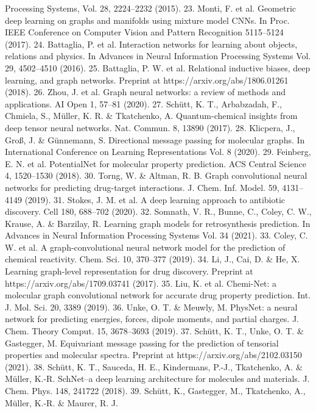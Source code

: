 Processing Systems, Vol. 28, 2224–2232 (2015).
	23.
Monti, F. et al. Geometric deep learning on graphs and manifolds using
mixture model CNNs. In Proc. IEEE Conference on Computer Vision and
Pattern Recognition 5115–5124 (2017).
	24.
Battaglia, P. et al. Interaction networks for learning about objects, relations
and physics. In Advances in Neural Information Processing Systems Vol. 29,
4502–4510 (2016).
	25.
Battaglia, P. W. et al. Relational inductive biases, deep learning, and graph
networks. Preprint at https://arxiv.org/abs/1806.01261 (2018).
	26.
Zhou, J. et al. Graph neural networks: a review of methods and
applications. AI Open 1, 57–81 (2020).
	27.
Schütt, K. T., Arbabzadah, F., Chmiela, S., Müller, K. R. \& Tkatchenko, A.
Quantum-chemical insights from deep tensor neural networks. Nat.
Commun. 8, 13890 (2017).
	28.
Klicpera, J., Groß, J. \& Günnemann, S. Directional message passing for
molecular graphs. In International Conference on Learning Representations
Vol. 8 (2020).
	29.
Feinberg, E. N. et al. PotentialNet for molecular property prediction. ACS
Central Science 4, 1520–1530 (2018).
	30.
Torng, W. \& Altman, R. B. Graph convolutional neural networks for
predicting drug-target interactions. J. Chem. Inf. Model. 59, 4131–4149
(2019).
	31.
Stokes, J. M. et al. A deep learning approach to antibiotic discovery. Cell
180, 688–702 (2020).
	32.
Somnath, V. R., Bunne, C., Coley, C. W., Krause, A. \& Barzilay, R. Learning
graph models for retrosynthesis prediction. In Advances in Neural
Information Processing Systems Vol. 34 (2021).
	33.
Coley, C. W. et al. A graph-convolutional neural network model for the
prediction of chemical reactivity. Chem. Sci. 10, 370–377 (2019).
	34.
Li, J., Cai, D. \& He, X. Learning graph-level representation for drug
discovery. Preprint at https://arxiv.org/abs/1709.03741 (2017).
	35.
Liu, K. et al. Chemi-Net: a molecular graph convolutional network for
accurate drug property prediction. Int. J. Mol. Sci. 20, 3389 (2019).
	36.
Unke, O. T. \& Meuwly, M. PhysNet: a neural network for predicting
energies, forces, dipole moments, and partial charges. J. Chem. Theory
Comput. 15, 3678–3693 (2019).
	37.
Schütt, K. T., Unke, O. T. \& Gastegger, M. Equivariant message passing for
the prediction of tensorial properties and molecular spectra. Preprint at
https://arxiv.org/abs/2102.03150 (2021).
	38.
Schütt, K. T., Sauceda, H. E., Kindermans, P.-J., Tkatchenko, A. \& Müller,
K.-R. SchNet–a deep learning architecture for molecules and materials. J.
Chem. Phys. 148, 241722 (2018).
	39.
Schütt, K., Gastegger, M., Tkatchenko, A., Müller, K.-R. \& Maurer, R. J.
